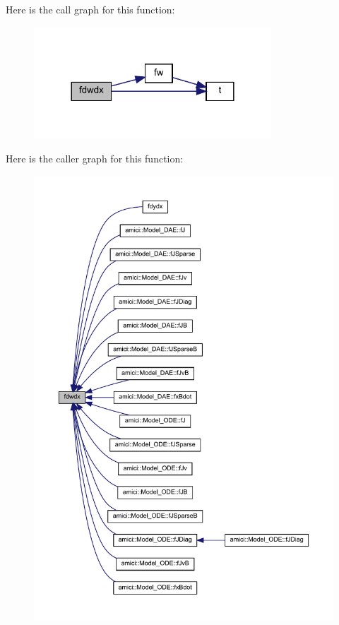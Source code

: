 Here is the call graph for this function\+:
\nopagebreak
\begin{figure}[H]
\begin{center}
\leavevmode
\includegraphics[width=252pt]{classamici_1_1_model_a29b16aa0c3fb0254fb248c003473d5f9_cgraph}
\end{center}
\end{figure}
Here is the caller graph for this function\+:
\nopagebreak
\begin{figure}[H]
\begin{center}
\leavevmode
\includegraphics[width=350pt]{classamici_1_1_model_a29b16aa0c3fb0254fb248c003473d5f9_icgraph}
\end{center}
\end{figure}
\mbox{\label{classamici_1_1_model_a991a9aab9f325625a35179fa601fa426}} 
